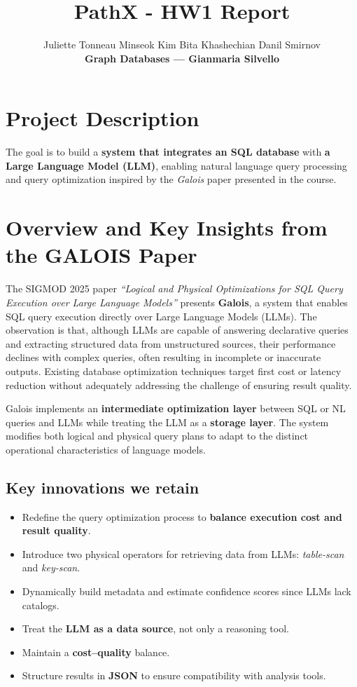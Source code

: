 \documentclass[11pt,a4paper]{article}
\title{PathX - HW1 Report}
\author{Juliette Tonneau \quad Minseok Kim \quad Bita Khashechian \quad Danil Smirnov\\[4pt]
\textbf{Graph Databases — Gianmaria Silvello}}
\begin{document}
\maketitle

\section{Project Description}

The goal is to build a \textbf{system that integrates an SQL database} with \textbf{a Large Language Model (LLM)}, enabling natural language query processing and query optimization inspired by the \emph{Galois} paper presented in the course.


\section{Overview and Key Insights from the GALOIS Paper}

The SIGMOD 2025 paper \emph{``Logical and Physical Optimizations for SQL Query Execution over Large Language Models''} presents \textbf{Galois}, a system that enables SQL query execution directly over Large Language Models (LLMs). The observation is that, although LLMs are capable of answering declarative queries and extracting structured data from unstructured sources, their performance declines with complex queries, often resulting in incomplete or inaccurate outputs. Existing database optimization techniques target first cost or latency reduction without adequately addressing the challenge of ensuring result quality.

Galois implements an \textbf{intermediate optimization layer} between SQL or NL queries and LLMs while treating the LLM as a \textbf{storage layer}. The system modifies both logical and physical query plans to adapt to the distinct operational characteristics of language models.

\subsection*{Key innovations we retain}

\begin{itemize}[nosep]
  \item Redefine the query optimization process to \textbf{balance execution cost and result quality}.
  \item Introduce two physical operators for retrieving data from LLMs: \emph{table-scan} and \emph{key-scan}.
  \item Dynamically build metadata and estimate confidence scores since LLMs lack catalogs.
  \item Treat the \textbf{LLM as a data source}, not only a reasoning tool.
  \item Maintain a \textbf{cost--quality} balance.
  \item Structure results in \textbf{JSON} to ensure compatibility with analysis tools.
\end{itemize}
\end{document}
